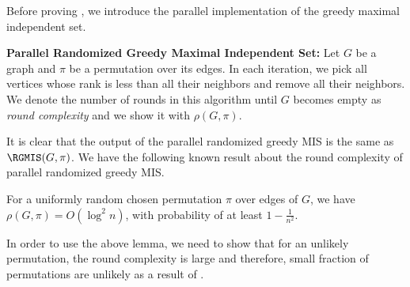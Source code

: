 Before proving , we introduce the parallel implementation of the greedy maximal independent set.

\noindent\textbf{Parallel Randomized Greedy Maximal Independent Set:} Let $G$ be a graph and $\pi$ be a permutation over its edges. In each iteration, we pick all vertices whose rank is less than all their neighbors and remove all their neighbors. We denote the number of rounds in this algorithm until $G$ becomes empty as \textit{round complexity} and we show it with $\rho(G, \pi)$.

It is clear that the output of the parallel randomized greedy MIS is the same as $\RGMIS(G, \pi)$. We have the following known result about the round complexity of parallel randomized greedy MIS.


\begin{lemma}\label{lem: parallel-RMGIS-rounds}
For a uniformly random chosen permutation $\pi$ over edges of $G$, we have $\rho(G, \pi) = O(\log^2 n)$, with probability of at least $1 - \frac{1}{n^2}$.
\end{lemma}


In order to use the above lemma, we need to show that for an unlikely permutation, the round complexity is large and therefore, small fraction of permutations are unlikely as a result of .

